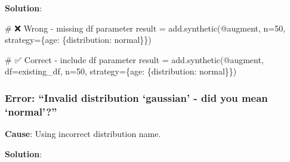 \documentclass[
  letterpaper,
]{scrbook}
\newenvironment{Shaded}{\begin{snugshade}}{\end{snugshade}}
\newcommand{\CommentTok}[1]{\textcolor[rgb]{0.37,0.37,0.37}{#1}}
\newcommand{\DecValTok}[1]{\textcolor[rgb]{0.68,0.00,0.00}{#1}}
\newcommand{\NormalTok}[1]{\textcolor[rgb]{0.00,0.23,0.31}{#1}}
\newcommand{\OperatorTok}[1]{\textcolor[rgb]{0.37,0.37,0.37}{#1}}
\newcommand{\StringTok}[1]{\textcolor[rgb]{0.13,0.47,0.30}{#1}}
\begin{document}
\textbf{Solution}:

\begin{Shaded}
\begin{Highlighting}[]
\CommentTok{\# ❌ Wrong {-} missing df parameter}
\NormalTok{result }\OperatorTok{=}\NormalTok{ add.synthetic(}\StringTok{\textquotesingle{}@augment\textquotesingle{}}\NormalTok{, n}\OperatorTok{=}\DecValTok{50}\NormalTok{, strategy}\OperatorTok{=}\NormalTok{\{}\StringTok{\textquotesingle{}age\textquotesingle{}}\NormalTok{: \{}\StringTok{\textquotesingle{}distribution\textquotesingle{}}\NormalTok{: }\StringTok{\textquotesingle{}normal\textquotesingle{}}\NormalTok{\}\})}

\CommentTok{\# ✅ Correct {-} include df parameter}
\NormalTok{result }\OperatorTok{=}\NormalTok{ add.synthetic(}\StringTok{\textquotesingle{}@augment\textquotesingle{}}\NormalTok{, df}\OperatorTok{=}\NormalTok{existing\_df, n}\OperatorTok{=}\DecValTok{50}\NormalTok{, }
\NormalTok{                       strategy}\OperatorTok{=}\NormalTok{\{}\StringTok{\textquotesingle{}age\textquotesingle{}}\NormalTok{: \{}\StringTok{\textquotesingle{}distribution\textquotesingle{}}\NormalTok{: }\StringTok{\textquotesingle{}normal\textquotesingle{}}\NormalTok{\}\})}
\end{Highlighting}
\end{Shaded}

\subsubsection{Error: ``Invalid distribution `gaussian' - did you mean
`normal'?''}\label{error-invalid-distribution-gaussian---did-you-mean-normal}

\textbf{Cause}: Using incorrect distribution name.

\textbf{Solution}:
\end{document}
